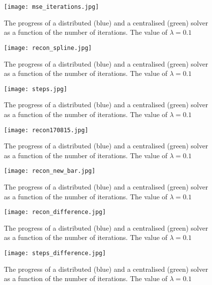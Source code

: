 \begin{figure}[h]
\centering
\texttt{[image: mse\_iterations.jpg]}
\caption{The progress of a distributed (blue) and a centralised (green) solver as a function of the number of iterations. The value of \(\lambda = 0.1\)}
\label{fig:erroriterations}
\end{figure}

\begin{figure}[h]
\centering
\texttt{[image: recon\_spline.jpg]}
\caption{The progress of a distributed (blue) and a centralised (green) solver as a function of the number of iterations. The value of \(\lambda = 0.1\)}
\label{fig:spline_recon}
\end{figure}

\begin{figure}[h]
\centering
\texttt{[image: steps.jpg]}
\caption{The progress of a distributed (blue) and a centralised (green) solver as a function of the number of iterations. The value of \(\lambda = 0.1\)}
\label{fig:steps_wavelets}
\end{figure}

\begin{figure}[h]
\centering
\texttt{[image: recon170815.jpg]}
\caption{The progress of a distributed (blue) and a centralised (green) solver as a function of the number of iterations. The value of \(\lambda = 0.1\)}
\label{fig:wavelet_recon}
\end{figure}

\begin{figure}[h]
\centering
\texttt{[image: recon\_new\_bar.jpg]}
\caption{The progress of a distributed (blue) and a centralised (green) solver as a function of the number of iterations. The value of \(\lambda = 0.1\)}
\label{fig:wavelet_recon_no_pwer_2}
\end{figure}

\begin{figure}[h]
\centering
\texttt{[image: recon\_difference.jpg]}
\caption{The progress of a distributed (blue) and a centralised (green) solver as a function of the number of iterations. The value of \(\lambda = 0.1\)}
\label{fig:erroriterations}
\end{figure}

\begin{figure}[h]
\centering
\texttt{[image: steps\_difference.jpg]}
\caption{The progress of a distributed (blue) and a centralised (green) solver as a function of the number of iterations. The value of \(\lambda = 0.1\)}
\label{fig:steps_difference}
\end{figure}

